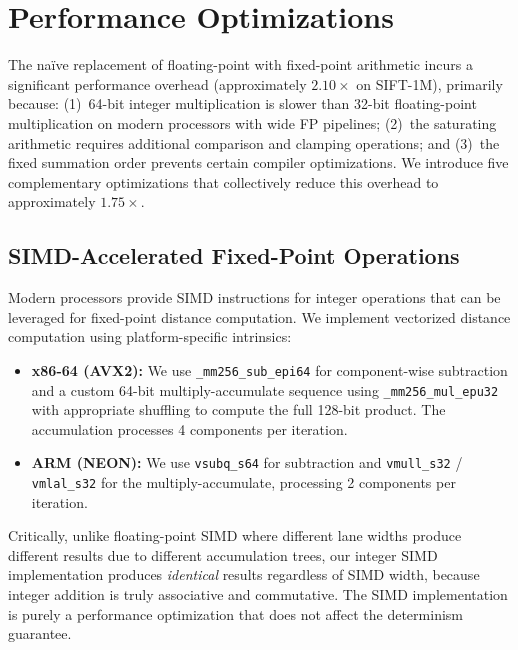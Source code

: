 \documentclass[10pt,journal,compsoc]{IEEEtran}
\begin{document}
\section{Performance Optimizations}
\label{sec:optimizations}

The na\"ive replacement of floating-point with fixed-point arithmetic incurs a significant performance overhead (approximately $2.10\times$ on SIFT-1M), primarily because: (1)~64-bit integer multiplication is slower than 32-bit floating-point multiplication on modern processors with wide FP pipelines; (2)~the saturating arithmetic requires additional comparison and clamping operations; and (3)~the fixed summation order prevents certain compiler optimizations. We introduce five complementary optimizations that collectively reduce this overhead to approximately $1.75\times$.

\subsection{SIMD-Accelerated Fixed-Point Operations}

Modern processors provide SIMD instructions for integer operations that can be leveraged for fixed-point distance computation. We implement vectorized distance computation using platform-specific intrinsics:

\begin{itemize}[leftmargin=*]
  \item \textbf{x86-64 (AVX2):} We use \texttt{\_mm256\_sub\_epi64} for component-wise subtraction and a custom 64-bit multiply-accumulate sequence using \texttt{\_mm256\_mul\_epu32} with appropriate shuffling to compute the full 128-bit product. The accumulation processes 4 components per iteration.

  \item \textbf{ARM (NEON):} We use \texttt{vsubq\_s64} for subtraction and \texttt{vmull\_s32} / \texttt{vmlal\_s32} for the multiply-accumulate, processing 2 components per iteration.
\end{itemize}

Critically, unlike floating-point SIMD where different lane widths produce different results due to different accumulation trees, our integer SIMD implementation produces \emph{identical} results regardless of SIMD width, because integer addition is truly associative and commutative. The SIMD implementation is purely a performance optimization that does not affect the determinism guarantee.
\end{document}

